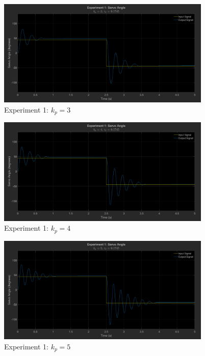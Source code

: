 \documentclass[12pt]{article}
\begin{document}
\begin{figure}[h]
    \centering
    \includegraphics[width=0.91\textwidth]{exp1_kp3}
    \caption{Experiment 1: $k_p = 3$}
\end{figure}
\begin{figure}[h]
    \centering
    \includegraphics[width=0.91\textwidth]{exp1_kp4}
    \caption{Experiment 1: $k_p = 4$}
\end{figure}
\begin{figure}[h]
    \centering
    \includegraphics[width=0.91\textwidth]{exp1_kp5}
    \caption{Experiment 1: $k_p = 5$}
\end{figure}

\clearpage
\end{document}

